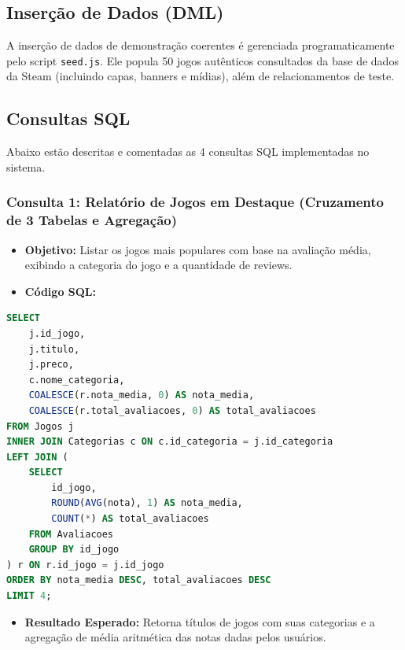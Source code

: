 \documentclass[12pt,a4paper]{article}
\begin{document}
\subsection{Inserção de Dados (DML)}
A inserção de dados de demonstração coerentes é gerenciada programaticamente pelo script \texttt{seed.js}. Ele popula 50 jogos autênticos consultados da base de dados da Steam (incluindo capas, banners e mídias), além de relacionamentos de teste.

\subsection{Consultas SQL}
Abaixo estão descritas e comentadas as 4 consultas SQL implementadas no sistema.

\subsubsection{Consulta 1: Relatório de Jogos em Destaque (Cruzamento de 3 Tabelas e Agregação)}
\begin{itemize}
    \item \textbf{Objetivo:} Listar os jogos mais populares com base na avaliação média, exibindo a categoria do jogo e a quantidade de reviews.
    \item \textbf{Código SQL:}
\end{itemize}
\begin{lstlisting}[language=SQL]
SELECT 
    j.id_jogo, 
    j.titulo, 
    j.preco, 
    c.nome_categoria,
    COALESCE(r.nota_media, 0) AS nota_media,
    COALESCE(r.total_avaliacoes, 0) AS total_avaliacoes
FROM Jogos j
INNER JOIN Categorias c ON c.id_categoria = j.id_categoria
LEFT JOIN (
    SELECT 
        id_jogo, 
        ROUND(AVG(nota), 1) AS nota_media, 
        COUNT(*) AS total_avaliacoes
    FROM Avaliacoes
    GROUP BY id_jogo
) r ON r.id_jogo = j.id_jogo
ORDER BY nota_media DESC, total_avaliacoes DESC
LIMIT 4;
\end{lstlisting}
\begin{itemize}
    \item \textbf{Resultado Esperado:} Retorna títulos de jogos com suas categorias e a agregação de média aritmética das notas dadas pelos usuários.
\end{itemize}
\end{document}
